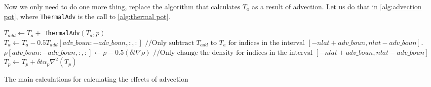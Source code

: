 Now we only need to do one more thing, replace the algorithm that calculates $T_a$ as a result of advection. Let us do that in \autoref{alg:advection pot}, where \texttt{ThermalAdv} is the call 
to \autoref{alg:thermal pot}.

\begin{algorithm}
    $T_{add} \leftarrow T_a + $ \texttt{ThermalAdv}$(T_a, p)$\;
    $T_a \leftarrow T_a - 0.5T_{add}[adv\_boun:-adv\_boun, :, :] \text{ //Only subtract } T_{add} \text{ to } T_a \text{ for indices in the interval } [-nlat + adv\_boun, nlat - adv\_boun]$. \;
    $\rho[adv\_boun: -adv\_boun, :, :] \leftarrow \rho - 0.5(\delta t \nabla \rho) \text{ //Only change the density for indices in the interval } [-nlat + adv\_boun, nlat - adv\_boun]$ \;
    $T_p \leftarrow T_p + \delta t \alpha_p \nabla^2(T_p)$ \;
    \caption{The main calculations for calculating the effects of advection}
    \label{alg:advection pot}
\end{algorithm}